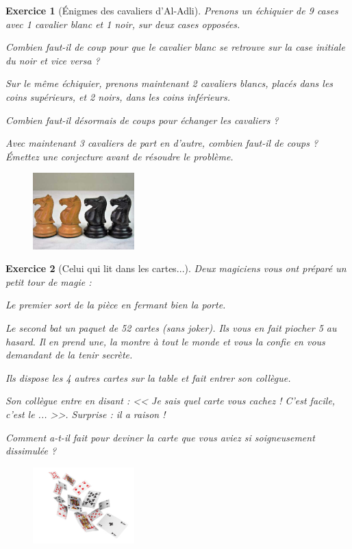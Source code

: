 \documentclass[12pt]{article}
\theoremstyle{break}
\newtheorem{exo}{Exercice}
\begin{document}
\begin{exo}[Énigmes des cavaliers d'Al-Adli]
Prenons un échiquier de 9 cases avec 1 cavalier blanc et 1 noir, sur deux cases opposées.

Combien faut-il de coup pour que le cavalier blanc se retrouve sur la case initiale du noir et vice versa ?

Sur le même échiquier, prenons maintenant 2 cavaliers blancs, placés dans les coins supérieurs, et 2 noirs, dans les coins inférieurs.

Combien faut-il désormais de coups pour échanger les cavaliers ?

Avec maintenant 3 cavaliers de part en d'autre, combien faut-il de coups ? \textit{Émettez une conjecture avant de résoudre le problème.}


\begin{figure}[h!]
	\centering
	\includegraphics[width=0.35\textwidth]{images/4Cavaliers.jpg}
\end{figure}
\end{exo}


\begin{exo}[Celui qui lit dans les cartes...]
Deux magiciens vous ont préparé un petit tour de magie :

Le premier sort de la pièce en fermant bien la porte.

Le second bat un paquet de 52 cartes (sans joker). Ils vous en fait piocher 5 au hasard. Il en prend une, la montre à tout le monde et vous la confie en vous demandant de la tenir secrète.

Ils dispose les 4 autres cartes sur la table et fait entrer son collègue.

Son collègue entre en disant : << Je sais quel carte vous cachez ! C'est facile, c'est le ... >>. Surprise : il a raison !

Comment a-t-il fait pour deviner la carte que vous aviez si soigneusement dissimulée ?


\begin{figure}[h!]
	\centering
	\includegraphics[width=0.35\textwidth]{images/Cartes.jpeg}
\end{figure}
\end{exo}
\end{document}

